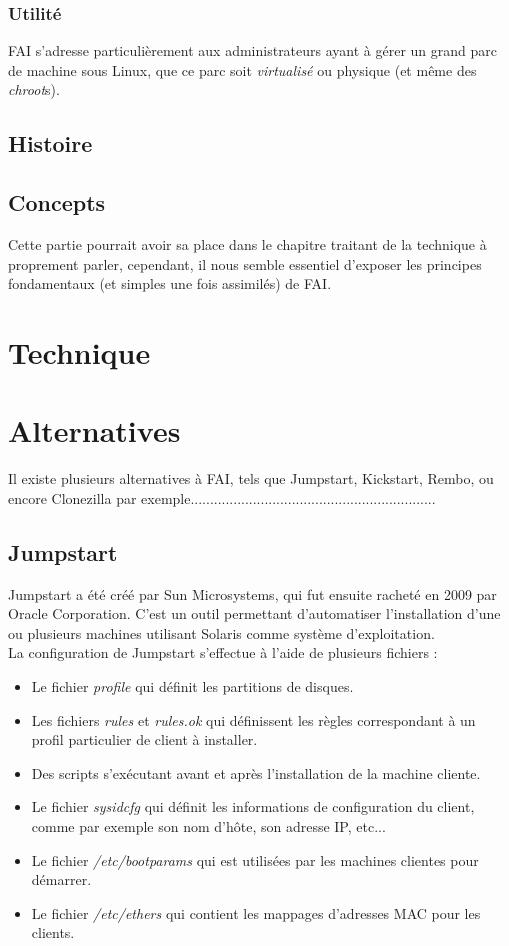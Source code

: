 \documentclass[a4paper,12pt,one side,titlepage]{report}
\begin{document}
\subsection{Utilité}
\textsc{FAI} s'adresse particulièrement aux administrateurs ayant à gérer un grand parc de machine sous Linux, que ce parc soit \textit{virtualisé} ou physique (et même des \textit{chroot}s).

\section{Histoire}


\section{Concepts}
Cette partie pourrait avoir sa place dans le chapitre traitant de la technique à proprement parler, cependant, il nous semble essentiel d'exposer les principes fondamentaux (et simples une fois assimilés) de \textsc{FAI}.



\chapter{Technique}

\chapter{Alternatives}
Il existe plusieurs alternatives à FAI, tels que Jumpstart, Kickstart, Rembo, ou encore Clonezilla par exemple...............................................................

\section{Jumpstart}
Jumpstart a été créé par Sun Microsystems, qui fut ensuite racheté en 2009 par Oracle Corporation. C'est un outil permettant d'automatiser l'installation d'une ou plusieurs machines utilisant Solaris comme système d'exploitation.\\
La configuration de Jumpstart s'effectue à l'aide de plusieurs fichiers :\\
\begin{itemize}
  \item Le fichier \textit{profile} qui définit les partitions de disques.
  \item Les fichiers \textit{rules} et \textit{rules.ok} qui définissent les règles correspondant à un profil particulier de client à installer.
  \item Des scripts s'exécutant avant et après l'installation de la machine cliente.
  \item Le fichier \textit{sysidcfg} qui définit les informations de configuration du client, comme par exemple son nom d'hôte, son adresse IP, etc...
  \item Le fichier \textit{/etc/bootparams} qui est utilisées par les machines clientes pour démarrer.
  \item Le fichier \textit{/etc/ethers} qui contient les mappages d'adresses MAC pour les clients.\\
\end{itemize}
\end{document}
